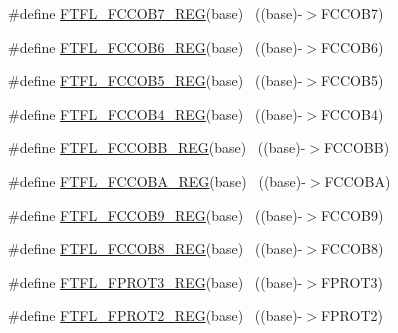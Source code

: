 \begin{DoxyCompactItemize}
\item 
\#define \hyperlink{group___f_t_f_l___register___accessor___macros_ga4dc682960fb3bdce9c012b91a56e8ec1}{F\+T\+F\+L\+\_\+\+F\+C\+C\+O\+B7\+\_\+\+R\+EG}(base)                                    ~((base)-\/$>$F\+C\+C\+O\+B7)
\item 
\#define \hyperlink{group___f_t_f_l___register___accessor___macros_ga0187db09b3ffc38e4c0202b3e1764b3f}{F\+T\+F\+L\+\_\+\+F\+C\+C\+O\+B6\+\_\+\+R\+EG}(base)                                    ~((base)-\/$>$F\+C\+C\+O\+B6)
\item 
\#define \hyperlink{group___f_t_f_l___register___accessor___macros_ga32f6aba32c376459e9d4245c477a2027}{F\+T\+F\+L\+\_\+\+F\+C\+C\+O\+B5\+\_\+\+R\+EG}(base)                                    ~((base)-\/$>$F\+C\+C\+O\+B5)
\item 
\#define \hyperlink{group___f_t_f_l___register___accessor___macros_gae0954f895054d630b956bf9c6655d98a}{F\+T\+F\+L\+\_\+\+F\+C\+C\+O\+B4\+\_\+\+R\+EG}(base)                                    ~((base)-\/$>$F\+C\+C\+O\+B4)
\item 
\#define \hyperlink{group___f_t_f_l___register___accessor___macros_ga3dae4e4d06922c93a79de6c1e2eee6e5}{F\+T\+F\+L\+\_\+\+F\+C\+C\+O\+B\+B\+\_\+\+R\+EG}(base)                                    ~((base)-\/$>$F\+C\+C\+O\+BB)
\item 
\#define \hyperlink{group___f_t_f_l___register___accessor___macros_ga694b40aa4457cef10f42dedada1ae800}{F\+T\+F\+L\+\_\+\+F\+C\+C\+O\+B\+A\+\_\+\+R\+EG}(base)                                    ~((base)-\/$>$F\+C\+C\+O\+BA)
\item 
\#define \hyperlink{group___f_t_f_l___register___accessor___macros_ga74b5065eee73b2f0cf777d95ef32eaf9}{F\+T\+F\+L\+\_\+\+F\+C\+C\+O\+B9\+\_\+\+R\+EG}(base)                                    ~((base)-\/$>$F\+C\+C\+O\+B9)
\item 
\#define \hyperlink{group___f_t_f_l___register___accessor___macros_ga5121541dc5124f6d4dbf91c6ff37f4eb}{F\+T\+F\+L\+\_\+\+F\+C\+C\+O\+B8\+\_\+\+R\+EG}(base)                                    ~((base)-\/$>$F\+C\+C\+O\+B8)
\item 
\#define \hyperlink{group___f_t_f_l___register___accessor___macros_ga3e7662648ae40179bc1b22849a460b6a}{F\+T\+F\+L\+\_\+\+F\+P\+R\+O\+T3\+\_\+\+R\+EG}(base)                                    ~((base)-\/$>$F\+P\+R\+O\+T3)
\item 
\#define \hyperlink{group___f_t_f_l___register___accessor___macros_ga3d2ae39f0e6774e167ee98627f68dd7a}{F\+T\+F\+L\+\_\+\+F\+P\+R\+O\+T2\+\_\+\+R\+EG}(base)                                    ~((base)-\/$>$F\+P\+R\+O\+T2)

\end{DoxyCompactItemize}
